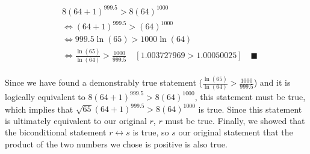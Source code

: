 \documentclass[letterpaper, 12pt]{article}
\newcommand{\qed}{\quad \blacksquare}
\begin{document}
\begin{enumerate}
\begin{align*}
    \begin{split}
        & 8(64 + 1)^{999.5} > 8(64)^{1000} \\
        &\iff (64 + 1)^{999.5} > (64)^{1000} \\
        &\iff 999.5\ln(65) > 1000\ln(64) \\
        &\iff \frac{\ln(65)}{\ln(64)} > \frac{1000}{999.5} \quad [1.003727969 > 1.00050025] \qed
    \end{split}
\end{align*}
\begin{flushleft}
    Since we have found a demonstrably true statement ($\frac{\ln(65)}{\ln(64)} > \frac{1000}{999.5}$) 
    and it is logically equivalent to $8(64 + 1)^{999.5} > 8(64)^{1000}$, this statement must 
    be true, which implies that $\sqrt{65}(64 + 1)^{999.5} > 8(64)^{1000}$ is true. Since this 
    statement is ultimately equivalent to our original $r$, $r$ must be true. Finally, we showed 
    that the biconditional statement $r \leftrightarrow s$ is true, so $s$ our original 
    statement that the product of the two numbers we chose is positive is also true.
\end{flushleft}
\end{enumerate}
\end{document}
